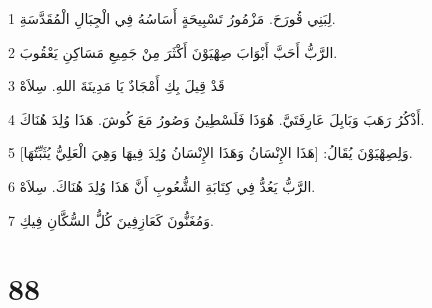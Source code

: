 \par 1 لِبَنِي قُورَحَ. مَزْمُورُ تَسْبِيحَةٍ أَسَاسُهُ فِي الْجِبَالِ الْمُقَدَّسَةِ.
\par 2 الرَّبُّ أَحَبَّ أَبْوَابَ صِهْيَوْنَ أَكْثَرَ مِنْ جَمِيعِ مَسَاكِنِ يَعْقُوبَ.
\par 3 قَدْ قِيلَ بِكِ أَمْجَادٌ يَا مَدِينَةَ اللهِ. سِلاَهْ
\par 4 أَذْكُرُ رَهَبَ وَبَابِلَ عَارِفَتَيَّ. هُوَذَا فَلَسْطِينُ وَصُورُ مَعَ كُوشَ. هَذَا وُلِدَ هُنَاكَ.
\par 5 وَلِصِهْيَوْنَ يُقَالُ: [هَذَا الإِنْسَانُ وَهَذَا الإِنْسَانُ وُلِدَ فِيهَا وَهِيَ الْعَلِيُّ يُثَبِّتُهَا].
\par 6 الرَّبُّ يَعُدُّ فِي كِتَابَةِ الشُّعُوبِ أَنَّ هَذَا وُلِدَ هُنَاكَ. سِلاَهْ.
\par 7 وَمُغَنُّونَ كَعَازِفِينَ كُلُّ السُّكَّانِ فِيكِ.

\chapter{88}

